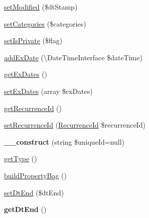 \begin{DoxyCompactItemize}
\item 
\mbox{\hyperlink{class_eluceo_1_1i_cal_1_1_component_1_1_event_aaebe7c920032e1ea1025db235c9d2003}{set\+Modified}} (\$dt\+Stamp)
\item 
\mbox{\hyperlink{class_eluceo_1_1i_cal_1_1_component_1_1_event_ab8e1826d0bbfa8741667e0c9c06ac186}{set\+Categories}} (\$categories)
\item 
\mbox{\hyperlink{class_eluceo_1_1i_cal_1_1_component_1_1_event_a4fb6334dcfa12640cd0a5e0014f30073}{set\+Is\+Private}} (\$flag)
\item 
\mbox{\hyperlink{class_eluceo_1_1i_cal_1_1_component_1_1_event_af5aeaa2d4977aff633e5d3d7b69e49e4}{add\+Ex\+Date}} (\textbackslash{}Date\+Time\+Interface \$date\+Time)
\item 
\mbox{\hyperlink{class_eluceo_1_1i_cal_1_1_component_1_1_event_a2809ef50254d73bbba21837f56dcad32}{get\+Ex\+Dates}} ()
\item 
\mbox{\hyperlink{class_eluceo_1_1i_cal_1_1_component_1_1_event_a7a5e86f13809c946c761268c804f139a}{set\+Ex\+Dates}} (array \$ex\+Dates)
\item 
\mbox{\hyperlink{class_eluceo_1_1i_cal_1_1_component_1_1_event_aa76dff4b92d0a324f6c553ec08b50451}{get\+Recurrence\+Id}} ()
\item 
\mbox{\hyperlink{class_eluceo_1_1i_cal_1_1_component_1_1_event_a58f917ab89985fa449ad2cff85477d0a}{set\+Recurrence\+Id}} (\mbox{\hyperlink{class_eluceo_1_1i_cal_1_1_property_1_1_event_1_1_recurrence_id}{Recurrence\+Id}} \$recurrence\+Id)
\item 
\mbox{\label{class_eluceo_1_1i_cal_1_1_component_1_1_event_aef22cbf45d882cfdf42290b5a70b50d4}} 
{\bfseries \+\_\+\+\_\+construct} (string \$unique\+Id=null)
\item 
\mbox{\hyperlink{class_eluceo_1_1i_cal_1_1_component_1_1_event_a705569387e533a6530b6696f3f157337}{get\+Type}} ()
\item 
\mbox{\hyperlink{class_eluceo_1_1i_cal_1_1_component_1_1_event_af5012821fe765f4901f9e18cdc0c33c5}{build\+Property\+Bag}} ()
\item 
\mbox{\hyperlink{class_eluceo_1_1i_cal_1_1_component_1_1_event_a89e2bf9ddc7f1ea8f4ddce0d287d0b6e}{set\+Dt\+End}} (\$dt\+End)
\item 
\mbox{\label{class_eluceo_1_1i_cal_1_1_component_1_1_event_a49fbe4c0f59c7a8bb28f8e417c64120a}} 
{\bfseries get\+Dt\+End} ()

\end{DoxyCompactItemize}
